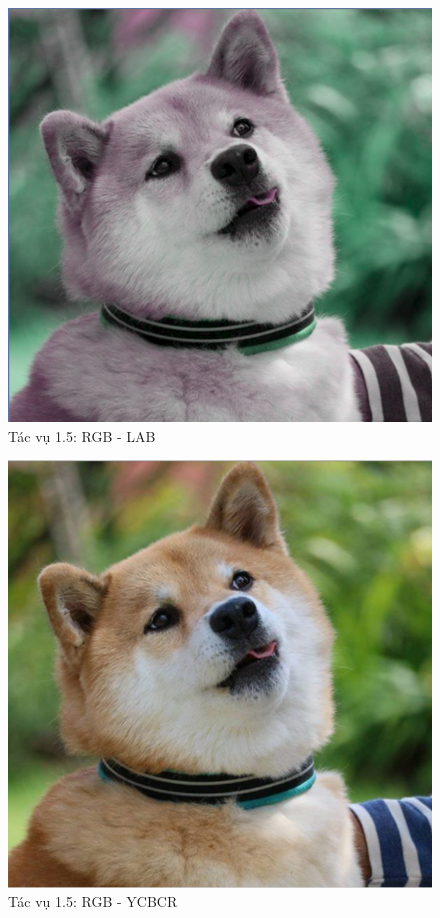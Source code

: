 \documentclass{article}
\begin{document}
		\begin{figure}[H]
			\centering
			\includegraphics[scale = 0.4]{15lab}
			\caption{Tác vụ 1.5: RGB - LAB}
		\end{figure}
		\begin{figure}[H]
			\centering
			\includegraphics[scale = 0.4]{15ycbcr}
			\caption{Tác vụ 1.5: RGB - YCBCR}
		\end{figure}
\end{document}
